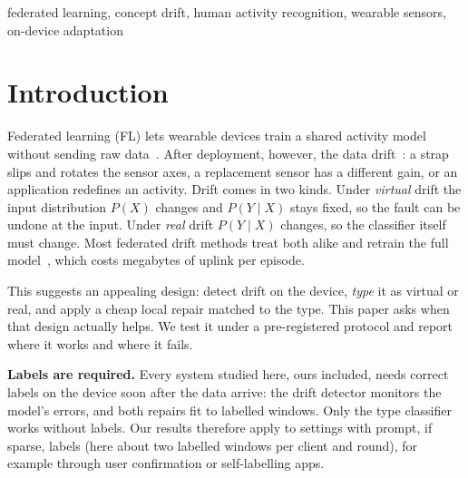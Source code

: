 \documentclass[conference]{IEEEtran}
\begin{document}
\begin{IEEEkeywords}
federated learning, concept drift, human activity recognition, wearable sensors, on-device adaptation
\end{IEEEkeywords}

\section{Introduction}
Federated learning (FL) lets wearable devices train a shared activity model without sending raw data~\cite{mcmahan2017fedavg,aouedi2024fedhar}. After deployment, however, the data drift~\cite{gama2014survey,lu2019learning}: a strap slips and rotates the sensor axes, a replacement sensor has a different gain, or an application redefines an activity. Drift comes in two kinds. Under \emph{virtual} drift the input distribution $P(X)$ changes and $P(Y\mid X)$ stays fixed, so the fault can be undone at the input. Under \emph{real} drift $P(Y\mid X)$ changes, so the classifier itself must change. Most federated drift methods treat both alike and retrain the full model~\cite{jothimurugesan2023feddrift,panchal2023flash}, which costs megabytes of uplink per episode.

This suggests an appealing design: detect drift on the device, \emph{type} it as virtual or real, and apply a cheap local repair matched to the type. This paper asks when that design actually helps. We test it under a pre-registered protocol and report where it works and where it fails.

\textbf{Labels are required.} Every system studied here, ours included, needs correct labels on the device soon after the data arrive: the drift detector monitors the model's errors, and both repairs fit to labelled windows. Only the type classifier works without labels. Our results therefore apply to settings with prompt, if sparse, labels (here about two labelled windows per client and round), for example through user confirmation or self-labelling apps.
\end{document}

